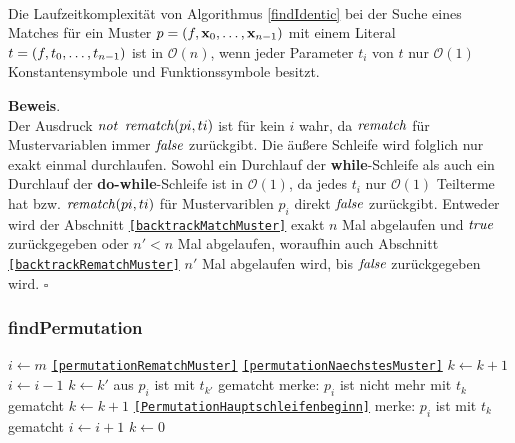 \begin{lemma}\label{lemKomplexitaetFindPermutation}~\\
Die Laufzeitkomplexität von Algorithmus \ref{findIdentic} bei der Suche eines Matches für ein Muster $p = (f, {\mathbf x}_{0}, \dots, {\mathbf x}_{n-1})$ mit einem Literal $t = (f, {t}_{0}, \dots, {t}_{n-1})$ ist in $\mathcal O(n)$, wenn jeder Parameter $t_i$ von $t$ nur $\mathcal O(1)$ Konstantensymbole und Funktionssymbole besitzt.
\end{lemma}

\textbf{Beweis}.\\
Der Ausdruck $\mathit{not}$ $\mathit{rematch}(pi , ti)$ ist für kein $i$ wahr, da $\mathit{rematch}$ für Mustervariablen immer $\mathit{false}$ zurückgibt. Die äußere Schleife wird folglich nur exakt einmal durchlaufen. Sowohl ein Durchlauf der \textbf{while}-Schleife als auch ein Durchlauf der \textbf{do-while}-Schleife ist in $\mathcal O(1)$, da jedes $t_i$ nur $\mathcal O(1)$ Teilterme hat bzw. $\mathit{rematch}(pi , ti)$ für Mustervariblen $p_i$ direkt $\mathit{false}$ zurückgibt. Entweder wird der Abschnitt \texttt{\ref{backtrackMatchMuster}} exakt $n$ Mal abgelaufen und $\mathit{true}$ zurückgegeben oder $n' < n$ Mal abgelaufen, woraufhin auch Abschnitt \texttt{\ref{backtrackRematchMuster}} $n'$ Mal abgelaufen wird, bis $\mathit{false}$ zurückgegeben wird. 
\hfill $\square$\\



\subsubsection {findPermutation}
\begin{algorithm}
\DontPrintSemicolon
\caption{$\Const{findPermutation} \colon M \times T \times \mathit{Bool} \rightarrow \mathit{Bool}$}\label{findPermutation}
\;
 {
	$i \leftarrow m$\;
	\Goto \texttt{\ref{permutationRematchMuster}}\;
}
  {
 }
 \label{PermutationHauptschleifenbeginn}
  {
	 {
		 {
			 {
				\Goto \texttt{\ref{permutationNaechstesMuster}}\;
			}
		}
		$k \leftarrow k + 1$\;
	}
	\label{permutationRematchMuster}
	 {
	}
	$i \leftarrow i - 1$\;
	{$k \leftarrow k'$ aus \glqq $p_{i}$ ist mit $t_{k'}$ gematcht\grqq{}}\;
	 {
		merke: $p_{i}$ ist nicht mehr mit $t_{k}$ gematcht\;
		$k \leftarrow k + 1$\;
		\Goto \texttt{\ref{PermutationHauptschleifenbeginn}}\;
	} 
	\label{permutationNaechstesMuster}
	merke: $p_i$ ist mit $t_k$ gematcht\;
	$i \leftarrow i + 1$\;
	$k \leftarrow 0$\;    
 }
\end{algorithm}

